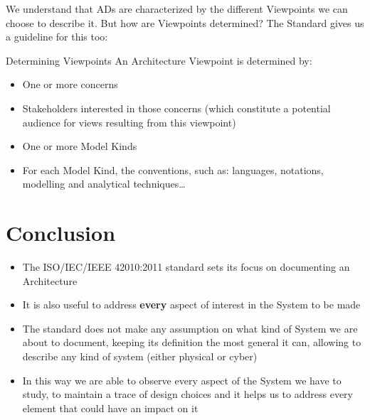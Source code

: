 		\begin{frame}
			We understand that ADs are characterized by the different Viewpoints we can choose to describe it.\newline\newline
			But how are Viewpoints determined? The Standard gives us a guideline for this too:
			\begin{block}{Determining Viewpoints}
				An Architecture Viewpoint is determined by:
				\begin{itemize}
					\item One or more concerns
					\item Stakeholders interested in those concerns (which constitute a potential audience for views resulting from this viewpoint)
					\item One or more Model Kinds
					\item For each Model Kind, the conventions, such as: languages, notations, modelling and analytical techniques\dots
				\end{itemize}
			\end{block}
		\end{frame}				
		
		\section{Conclusion}
		
		\begin{frame}
			\begin{itemize}
			
			\item The ISO/IEC/IEEE 42010:2011 standard sets its focus on documenting an Architecture
			
			\vspace{0.3cm}
			\item It is also useful to address \textbf{every} aspect of interest in the System to be made
			
			\vspace{0.3cm}
			\item The standard does not make any assumption on what kind of System we are about to document, keeping its definition the most general it can, allowing to describe any kind of system (either physical or cyber)
			\vspace{0.3cm}
			\item In this way we are able to observe every aspect of the System we have to study, to maintain a trace of design choices and it helps us to address every element that could have an impact on it
			\end{itemize}
		\end{frame}
		
